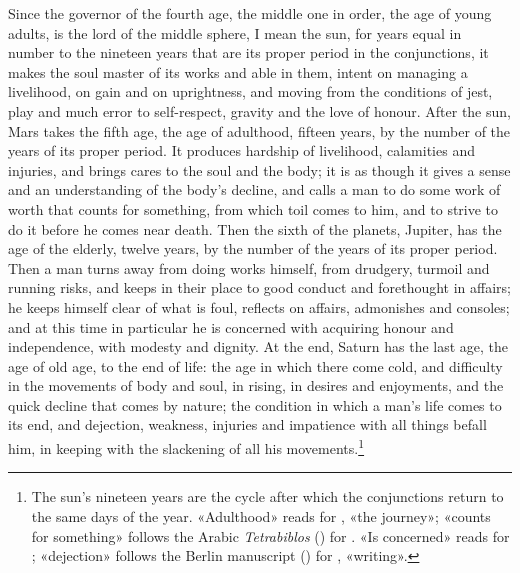 \documentclass[11pt]{article}
\newcommand{\Fol}[1]{\marginpar{\footnotesize\color{gray}f.\,#1}}
\begin{document}
\par \Fol{76v}Since the governor of the fourth age, the middle one in order, the age of young adults, is the lord of the middle sphere, I mean the sun, for years equal in number to the nineteen years that are its proper period in the conjunctions, it makes the soul master of its works and able in them, intent on managing a livelihood, on gain and on uprightness, and moving from the conditions of jest, play and much error to self-respect, gravity and the love of honour. After the sun, Mars takes the fifth age, the age of adulthood, fifteen years, by the number of the years of its proper period. It produces hardship of livelihood, calamities and injuries, and brings cares to the soul and the body; it is as though it gives a sense and an understanding of the body's decline, and calls a man to do some work of worth that counts for something, from which toil comes to him, and to strive to do it before he comes near death. Then the sixth of the planets, Jupiter, has the age of the elderly, twelve years, by the number of the years of its proper period. Then a man turns away from doing works himself, from drudgery, turmoil and running risks, and keeps in their place to good conduct and forethought in affairs; he keeps himself clear of what is foul, reflects on affairs, admonishes and consoles; and at this time in particular he is concerned with acquiring honour and independence, with modesty and dignity. At the end, Saturn has the last age, the age of old age, to the end of life: the age in which there come cold, and difficulty in the movements of body and soul, in rising, in desires and enjoyments, and the quick decline that comes by nature; the condition in which a man's life comes to its end, and dejection, weakness, injuries and impatience with all things befall him, in keeping with the slackening of all his movements.\footnote{The sun's nineteen years are the cycle after which the conjunctions return to the same days of the year. «Adulthood» reads  for , «the journey»; «counts for something» follows the Arabic \emph{Tetrabiblos} () for . «Is concerned» reads  for ; «dejection» follows the Berlin manuscript () for , «writing».}\par
\end{document}
